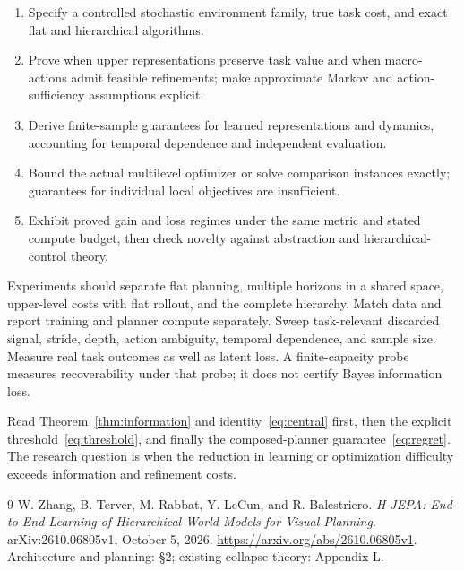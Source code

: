 \documentclass[11pt]{article}
\begin{document}
\begin{enumerate}
 \item Specify a controlled stochastic environment family, true task cost, and exact flat and hierarchical algorithms.
 \item Prove when upper representations preserve task value and when macro-actions admit feasible refinements; make approximate Markov and action-sufficiency assumptions explicit.
 \item Derive finite-sample guarantees for learned representations and dynamics, accounting for temporal dependence and independent evaluation.
 \item Bound the actual multilevel optimizer or solve comparison instances exactly; guarantees for individual local objectives are insufficient.
 \item Exhibit proved gain and loss regimes under the same metric and stated compute budget, then check novelty against abstraction and hierarchical-control theory.
\end{enumerate}

Experiments should separate flat planning, multiple horizons in a shared space, upper-level costs with flat rollout, and the complete hierarchy. Match data and report training and planner compute separately. Sweep task-relevant discarded signal, stride, depth, action ambiguity, temporal dependence, and sample size. Measure real task outcomes as well as latent loss. A finite-capacity probe measures recoverability under that probe; it does not certify Bayes information loss.

Read Theorem~\ref{thm:information} and identity~\eqref{eq:central} first, then the explicit threshold~\eqref{eq:threshold}, and finally the composed-planner guarantee~\eqref{eq:regret}. The research question is when the reduction in learning or optimization difficulty exceeds information and refinement costs.

\begin{thebibliography}{9}
W. Zhang, B. Terver, M. Rabbat, Y. LeCun, and R. Balestriero.
\emph{H-JEPA: End-to-End Learning of Hierarchical World Models for Visual Planning}.
arXiv:2610.06805v1, October 5, 2026.
\url{https://arxiv.org/abs/2610.06805v1}.
Architecture and planning: \S2; existing collapse theory: Appendix L.
\end{thebibliography}
\end{document}
